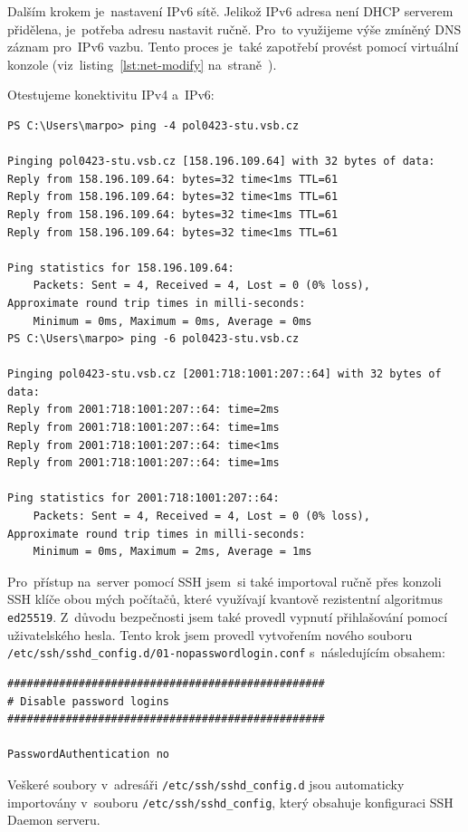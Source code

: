 Dalším krokem je~nastavení IPv6 sítě. Jelikož IPv6 adresa není
DHCP serverem přidělena, je~potřeba adresu nastavit ručně. Pro~to
využijeme výše zmíněný DNS záznam pro~IPv6 vazbu. Tento proces
je~také zapotřebí provést pomocí virtuální konzole
(viz~listing~\ref{lst:net-modify} na~straně~\pageref{lst:net-modify}).

Otestujeme konektivitu IPv4 a~IPv6:

\begin{verbatim}
PS C:\Users\marpo> ping -4 pol0423-stu.vsb.cz

Pinging pol0423-stu.vsb.cz [158.196.109.64] with 32 bytes of data:
Reply from 158.196.109.64: bytes=32 time<1ms TTL=61
Reply from 158.196.109.64: bytes=32 time<1ms TTL=61
Reply from 158.196.109.64: bytes=32 time<1ms TTL=61
Reply from 158.196.109.64: bytes=32 time<1ms TTL=61

Ping statistics for 158.196.109.64:
    Packets: Sent = 4, Received = 4, Lost = 0 (0% loss),
Approximate round trip times in milli-seconds:
    Minimum = 0ms, Maximum = 0ms, Average = 0ms
PS C:\Users\marpo> ping -6 pol0423-stu.vsb.cz

Pinging pol0423-stu.vsb.cz [2001:718:1001:207::64] with 32 bytes of data:
Reply from 2001:718:1001:207::64: time=2ms
Reply from 2001:718:1001:207::64: time=1ms
Reply from 2001:718:1001:207::64: time<1ms
Reply from 2001:718:1001:207::64: time=1ms

Ping statistics for 2001:718:1001:207::64:
    Packets: Sent = 4, Received = 4, Lost = 0 (0% loss),
Approximate round trip times in milli-seconds:
    Minimum = 0ms, Maximum = 2ms, Average = 1ms
\end{verbatim}

Pro~přístup na~server pomocí SSH jsem~si také importoval ručně
přes konzoli SSH klíče obou mých počítačů, které využívají kvantově
rezistentní algoritmus \texttt{ed25519}. Z~důvodu bezpečnosti jsem
také provedl vypnutí přihlašování pomocí uživatelského hesla.
Tento krok jsem provedl vytvořením nového souboru
\texttt{/etc/ssh/sshd\_config.d/01-nopasswordlogin.conf}
s~následujícím obsahem:

\newpage

\begin{verbatim}
#################################################
# Disable password logins
#################################################

PasswordAuthentication no
\end{verbatim}

Veškeré soubory v~adresáři \texttt{/etc/ssh/sshd\_config.d} jsou
automaticky importovány v~souboru \texttt{/etc/ssh/sshd\_config},
který obsahuje konfiguraci SSH Daemon serveru.

